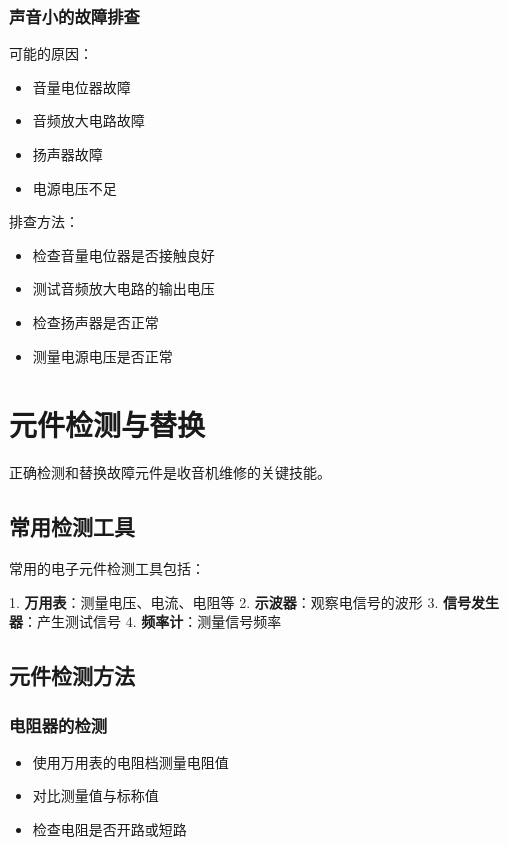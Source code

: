\documentclass[12pt,UTF8]{ctexbook}
\begin{document}
\subsection{声音小的故障排查}

可能的原因：\begin{itemize}
  \item 音量电位器故障
  \item 音频放大电路故障
  \item 扬声器故障
  \item 电源电压不足\end{itemize}

排查方法：\begin{itemize}
  \item 检查音量电位器是否接触良好
  \item 测试音频放大电路的输出电压
  \item 检查扬声器是否正常
  \item 测量电源电压是否正常\end{itemize}

\chapter{元件检测与替换}

正确检测和替换故障元件是收音机维修的关键技能。

\section{常用检测工具}

常用的电子元件检测工具包括：

1. \textbf{万用表}：测量电压、电流、电阻等
2. \textbf{示波器}：观察电信号的波形
3. \textbf{信号发生器}：产生测试信号
4. \textbf{频率计}：测量信号频率

\section{元件检测方法}

\subsection{电阻器的检测}\begin{itemize}
  \item 使用万用表的电阻档测量电阻值
  \item 对比测量值与标称值
  \item 检查电阻是否开路或短路\end{itemize}
\end{document}
